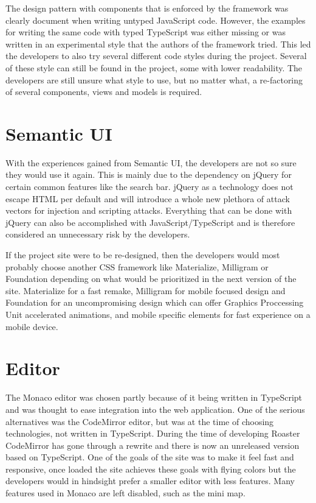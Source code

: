 \documentclass[12pt,a4paper]{report}
\begin{document}
The design pattern with components that is enforced by the framework was clearly document when writing untyped JavaScript code. However, the examples for writing the same code with typed TypeScript was either missing or was written in an experimental style that the authors of the framework tried. This led the developers to also try several different code styles during the project. Several of these style can still be found in the project, some with lower readability. The developers are still unsure what style to use, but no matter what, a re-factoring of several components, views and models is required.

\section{Semantic UI}
With the experiences gained from Semantic UI, the developers are not so sure they would use it again. This is mainly due to the dependency on jQuery for certain common features like the search bar. jQuery as a technology does not escape HTML per default\cite{jquery-sucks} and will introduce a whole new plethora of attack vectors for injection and scripting attacks. Everything that can be done with jQuery can also be accomplished with JavaScript/TypeScript and is therefore considered an unnecessary risk by the developers.

If the project site were to be re-designed, then the developers would most probably choose another CSS framework like Materialize, Milligram or Foundation depending on what would be prioritized in the next version of the site. Materialize\cite{materialize} for a fast remake, Milligram\cite{milligram} for mobile focused design and Foundation\cite{foundation} for an uncompromising design which can offer Graphics Proccessing Unit accelerated animations, and mobile specific elements for fast experience on a mobile device.

\section{Editor}
The Monaco editor was chosen partly because of it being written in TypeScript and was thought to ease integration into the web application. One of the serious alternatives was the CodeMirror editor\cite{codemirror}, but was at the time of choosing technologies, not written in TypeScript. During the time of developing Roaster CodeMirror has gone through a rewrite and there is now an unreleased version based on TypeScript\cite{codemirror-ts}. One of the goals of the site was to make it feel fast and responsive, once loaded the site achieves these goals with flying colors but the developers would in hindsight prefer a smaller editor with less features. Many features used in Monaco are left disabled, such as the mini map.
\end{document}
